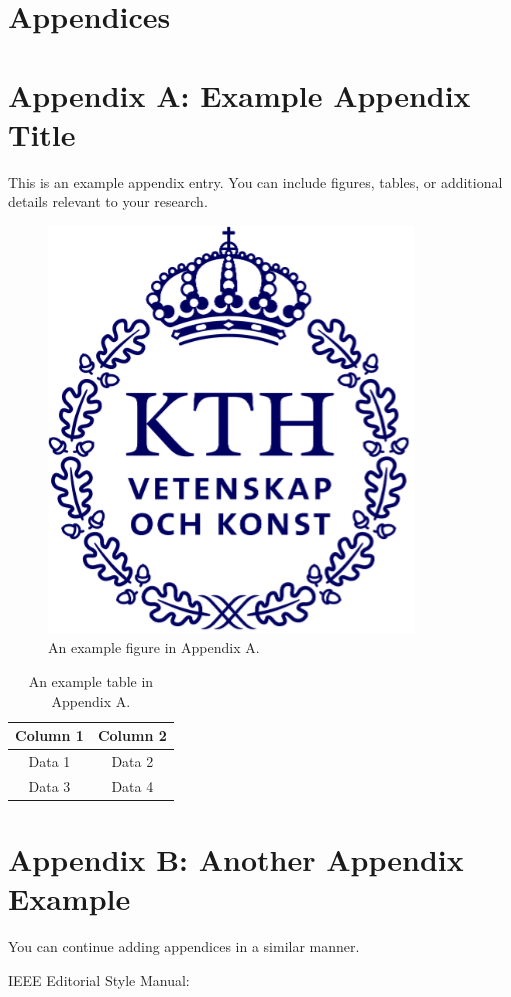 \documentclass[a4paper,10pt,twocolumn]{article}
\numberwithin{figure}{section}
\numberwithin{table}{section}
\begin{document}
\newpage
\onecolumn
\appendix  %
{} %
\section*{Appendices} %
\renewcommand{\thesubsection}{\Alph{subsection}} %

\section{Appendix A: Example Appendix Title}
\label{appendix:A}
This is an example appendix entry. You can include figures, tables, or additional details relevant to your research.

\begin{figure}[htbp]
    \centering
    \includegraphics[width=0.4\linewidth]{kthLogga.png}  %
    \caption{An example figure in Appendix A.}
    \label{fig:appendixA}  
\end{figure}

\begin{table}[htbp]
    \centering
    \begin{tabular}{|c|c|}
        \hline
        Column 1 & Column 2 \\
        \hline
        Data 1 & Data 2 \\
        Data 3 & Data 4 \\
        \hline
    \end{tabular}
    \caption{An example table in Appendix A.}
    \label{tab:appendixA}  
\end{table}

\newpage
\section{Appendix B: Another Appendix Example}
\label{appendix:B}
You can continue adding appendices in a similar manner.

IEEE Editorial Style Manual: 
	
\end{document}
